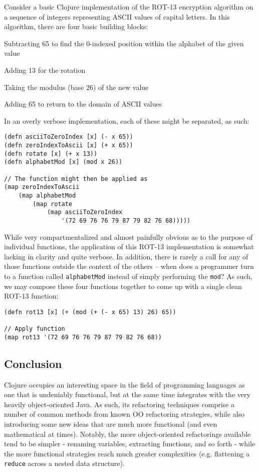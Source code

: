 \documentclass{article}
\begin{document}
Consider a basic Clojure implementation of the ROT-13 encryption algorithm on a sequence of integers representing ASCII values of capital letters. In this algorithm, there are four basic building blocks:

\begin{itemize*}
\item Subtracting 65 to find the 0-indexed position within the alphabet of the given value
\item Adding 13 for the rotation
\item Taking the modulus (base 26) of the new value
\item Adding 65 to return to the domain of ASCII values
\end{itemize*}

In an overly verbose implementation, each of these might be separated, as such:

\begin{verbatim}
(defn asciiToZeroIndex [x] (- x 65))
(defn zeroIndexToAscii [x] (+ x 65))
(defn rotate [x] (+ x 13))
(defn alphabetMod [x] (mod x 26))

// The function might then be applied as
(map zeroIndexToAscii
    (map alphabetMod
        (map rotate
            (map asciiToZeroIndex 
                '(72 69 76 76 79 87 79 82 76 68)))))
\end{verbatim}

While very compartmentalized and almost painfully obvious as to the purpose of individual functions, the application of this ROT-13 implementation is somewhat lacking in clarity and quite verbose. In addition, there is rarely a call for any of those functions outside the context of the others -- when does a programmer turn to a function called \verb!alphabetMod! instead of simply performing the \verb!mod!? As such, we may compose these four functions together to come up with a single clean ROT-13 function:

\begin{verbatim}
(defn rot13 [x] (+ (mod (+ (- x 65) 13) 26) 65))

// Apply function
(map rot13 '(72 69 76 76 79 87 79 82 76 68))
\end{verbatim}

\subsection{Conclusion}

Clojure occupies an interesting space in the field of programming languages as one that is undeniably functional, but at the same time integrates with the very heavily object-oriented Java. As such, its refactoring techniques comprise a number of common methods from known OO refactoring strategies, while also introducing some new ideas that are much more functional (and even mathematical at times). Notably, the more object-oriented refactorings available tend to be simpler - renaming variables, extracting functions, and so forth - while the more functional strategies reach much greater complexities (e.g. flattening a \verb!reduce! across a nested data structure).
\end{document}
